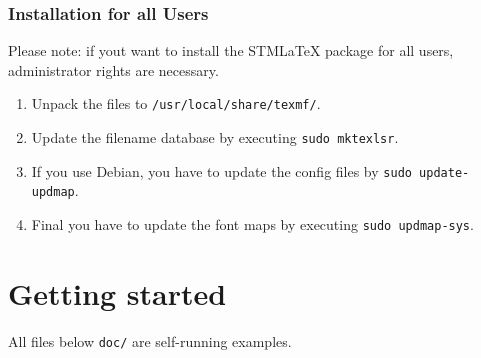 \documentclass[%
  type=article,%
  layout=koma,%
  page=false,%
  hyperref=true,%
  cleveref=true,%
  conditionallox=true,%
  conditionalloxnewpage=true,%
  date=true,%
  glossaries=true,%
  index=true,%
  listings=true%
]{stmtext}
\newcommand{\stmlatex}{STM\LaTeX\xspace}
\begin{document}
\subsubsection{Installation for all Users}
Please note: if yout want to install the \stmlatex package for all users, administrator rights are necessary.
\begin{enumerate}
  \item Unpack the files to \texttt{/usr/local/share/texmf/}.
  \item Update the filename database by executing \texttt{sudo mktexlsr}.
  \item If you use Debian, you have to update the config files by \texttt{sudo update-updmap}.
  \item Final you have to update the font maps by executing \texttt{sudo updmap-sys}.
\end{enumerate}

\section{Getting started}

All files below \texttt{doc/} are self-running examples.
\end{document}
